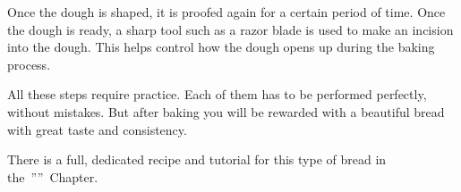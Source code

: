 Once the dough is shaped, it is proofed again for a certain
period of time. Once the dough is ready, a sharp tool such
as a razor blade is used to make an incision into the dough.
This helps control how the dough opens up during the baking process.

All these steps require practice. Each of them has to be
performed perfectly, without mistakes.
But after baking you will be rewarded with a beautiful bread
with great taste and consistency.

There is a full, dedicated recipe and tutorial
for this type of bread in the~''''~Chapter.
